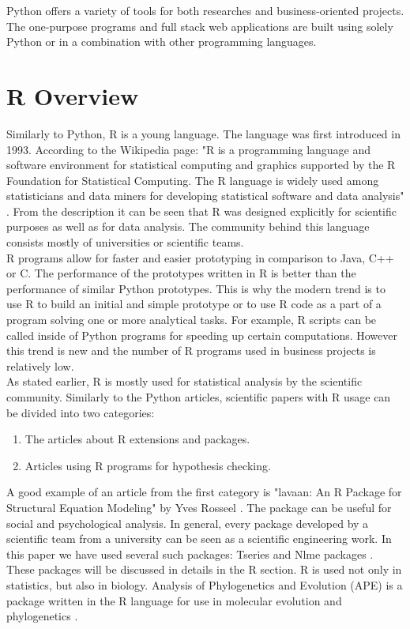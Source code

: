 \documentclass[
  twoside,
  11pt, a4paper,
  footinclude=true,
  headinclude=true,
  cleardoublepage=empty
]{scrreprt}
\begin{document}
        Python offers a variety of tools for both researches and business-oriented projects. The one-purpose programs and full stack web applications are built using solely Python or in a combination with other programming languages. 
        
        \section{R Overview}
        Similarly to Python, R is a young language. The language was first introduced in 1993. According to the Wikipedia page: "R is a programming language and software environment for statistical computing and graphics supported by the R Foundation for Statistical Computing. The R language is widely used among statisticians and data miners for developing statistical software and data analysis" \cite{r:Basic}. From the description it can be seen that R was designed explicitly for scientific purposes as well as for data analysis. The community behind this language consists mostly of universities or scientific teams. \\
        R programs allow for faster and easier prototyping in comparison to Java, C++ or C. The performance of the prototypes written in R is better than the performance of similar Python prototypes. This is why the modern trend is to use R to build an initial and simple prototype or to use R code as a part of a program solving one or more analytical tasks. For example, R scripts can be called inside of Python programs for speeding up certain computations. However this trend is new and the number of R programs used in business projects is relatively low.\\
        As stated earlier, R is mostly used for statistical analysis by the scientific community. Similarly to the Python articles, scientific papers with R usage can be divided into two categories:
        \begin{enumerate}
            \item The articles about R extensions and packages.
            \item Articles using R programs for hypothesis checking.
        \end{enumerate}
        A good example of an article from the first category is "lavaan: An R Package for Structural Equation Modeling" by Yves Rosseel \cite{r:Example0}. The package can be useful for social and psychological analysis. In general, every package developed by a scientific team from a university can be seen as a scientific engineering work. In this paper we have used several such packages: Tseries \cite{r:Tseries} and Nlme packages \cite{r:Nlme}. These packages will be discussed in details in the R section. R is used not only in statistics, but also in biology. Analysis of Phylogenetics and Evolution (APE) is a package written in the R language for use in molecular evolution and phylogenetics \cite{r:Ape}.
\end{document}
